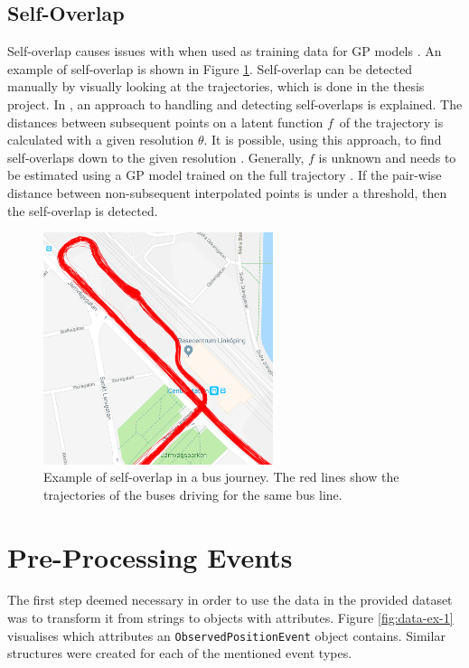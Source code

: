 \subsection{Self-Overlap} \label{sec:self-overlapping-trajectories}

Self-overlap causes issues with when used as training data for GP models \cite{Tiger2018-gp-motion-pattern}.
An example of self-overlap is shown in Figure \ref{fig:self-overlap}.
Self-overlap can be detected manually by visually looking at the trajectories, which is done in the thesis project.
In \cite{Tiger2015-online-sparse}, an approach to handling and detecting self-overlaps is explained.
The distances between subsequent points on a latent function $f$ of the trajectory is calculated with a given resolution $\theta$.
It is possible, using this approach, to find self-overlaps down to the given resolution \cite{Tiger2015-online-sparse}.
Generally, $f$ is unknown and needs to be estimated using a GP model trained on the full trajectory \cite{Tiger2015-online-sparse}.
If the pair-wise distance between non-subsequent interpolated points is under a threshold, then the self-overlap is detected.   

\begin{figure}[t!]
    \centering
    \includegraphics[width=0.6\textwidth]{figures/self-overlap}
    \caption[Example of self-overlap in a bus journey]
    {\small Example of self-overlap in a bus journey. 
    The red lines show the trajectories of the buses driving for the same bus line.}
    \label{fig:self-overlap}
\end{figure}

\section{Pre-Processing Events} \label{sec:pre-process-events}
The first step deemed necessary in order to use the data in the provided dataset was to transform it from strings to objects with attributes.
Figure \ref{fig:data-ex-1} visualises which attributes an \texttt{ObservedPositionEvent} object contains.
Similar structures were created for each of the mentioned event types.

